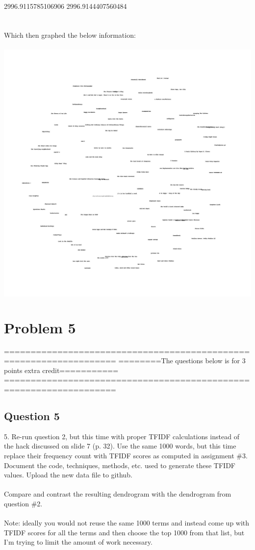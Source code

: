 \documentclass[10pt,letterpaper]{article}
\begin{document}
2996.9115785106906
2996.9144407560484
\\
\\
\\
Which then graphed the below information:\\
\\
\includegraphics[scale=.25]{blogs2d.jpg} 

\pagebreak
\section{Problem 5}
===================================================================
========The questions below is for 3 points extra credit===========
===================================================================
\subsection{Question 5}
5.  Re-run question 2, but this time with proper TFIDF calculations instead of the hack discussed on slide 7 (p. 32).  Use the same 1000 words, but this time replace their frequency count with TFIDF scores as computed in assignment \#3.  Document the code, techniques, methods, etc. used to generate these TFIDF values.  Upload the new data file to github.\\
\\
Compare and contrast the resulting dendrogram with the dendrogram from question \#2.\\
\\
Note: ideally you would not reuse the same 1000 terms and instead come up with TFIDF scores for all the terms and then choose the top 1000 from that list, but I'm trying to limit the amount of work necessary.\\
\\
\end{document}
